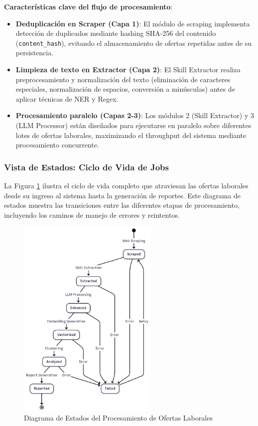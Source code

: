 \textbf{Características clave del flujo de procesamiento}:
\begin{itemize}
    \item \textbf{Deduplicación en Scraper (Capa 1)}: El módulo de scraping implementa detección de duplicados mediante hashing SHA-256 del contenido (\texttt{content\_hash}), evitando el almacenamiento de ofertas repetidas antes de su persistencia.

    \item \textbf{Limpieza de texto en Extractor (Capa 2)}: El Skill Extractor realiza preprocesamiento y normalización del texto (eliminación de caracteres especiales, normalización de espacios, conversión a minúsculas) antes de aplicar técnicas de NER y Regex.

    \item \textbf{Procesamiento paralelo (Capas 2-3)}: Los módulos 2 (Skill Extractor) y 3 (LLM Processor) están diseñados para ejecutarse en paralelo sobre diferentes lotes de ofertas laborales, maximizando el throughput del sistema mediante procesamiento concurrente.
\end{itemize}

\subsubsection{Vista de Estados: Ciclo de Vida de Jobs}

La Figura \ref{fig:estados-jobs} ilustra el ciclo de vida completo que atraviesan las ofertas laborales desde su ingreso al sistema hasta la generación de reportes. Este diagrama de estados muestra las transiciones entre las diferentes etapas de procesamiento, incluyendo los caminos de manejo de errores y reintentos.

\begin{figure}[H]
\centering
\includegraphics[width=0.6\textwidth]{diagrams/DiagramaEstado.png}
\caption{Diagrama de Estados del Procesamiento de Ofertas Laborales}
\label{fig:estados-jobs}
\end{figure}

